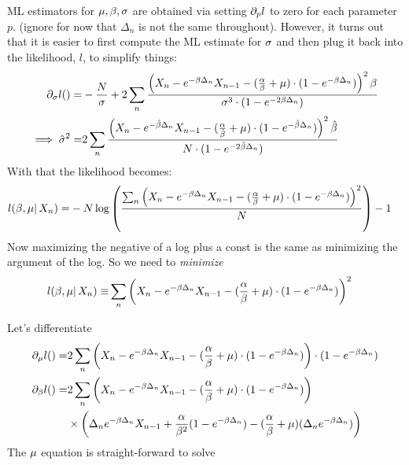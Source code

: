 \documentclass{article}
\begin{document}
ML estimators for ${\mu },{\beta},{\sigma }$ are obtained via setting ${\partial}_{p} l$ to zero for
each parameter $p$. (ignore for now that $\Delta_n$ is not the same throughout).
However, it turns out that it is easier to first compute the ML estimate for
${\sigma }$ and then plug it back into the likelihood, $l$, to simplify things:
\begin{align}
{\partial}_{{\sigma }} l()=& -\frac N{{\sigma }} + 2\sum_n
\frac{ \left( X_n - e^{-{\beta} \Delta_n} X_{n-1} -
				 (\frac {{\alpha}}{{\beta}} + {\mu }) \cdot ( 1-e^{-{\beta} \Delta_n}) \right)^2 {\beta}}
				 {{\sigma }^3 \cdot (1-e^{-2{\beta}\Delta_n})}
				 \notag
				 \\ 
\implies \hat{{\sigma }}^2 =& 2\sum_n \frac{ \left( X_n - e^{-\hat{{\beta}} \Delta_n} X_{n-1} -
				 (\frac {{\alpha}}{\hat{{\beta}}} + {\mu }) \cdot ( 1-e^{-\hat{{\beta}} \Delta_n}) \right)^2
				 \hat{{\beta}}} {N \cdot (1-e^{-2\hat{{\beta}}\Delta_n})}
				 \label{eq:sigma_root}
\end{align}
With that the likelihood becomes:
\begin{align*}
l({\beta}, {\mu } |\, X_n )=& 
 -N\log \left( 
 \frac{ \sum_n\left( X_n - e^{-{\beta} \Delta_n} X_{n-1} -
  (\frac {{{\alpha}}}{{{\beta}}} + {\mu }) \cdot ( 1-e^{-{\beta} \Delta_n})
  \right)^2}{N} \right) - 1
\end{align*}
Now maximizing the negative of a log plus a const is the same as minimizing the
argument of the log. So we need to {\itshape minimize}
\begin{align*}
l({\beta}, {\mu } |\, X_n )\equiv& 
\sum_n \left( X_n - e^{-{\beta} \Delta_n} X_{n-1} -
  (\frac {{{\alpha}}}{{{\beta}}} + {\mu }) \cdot ( 1-e^{-{\beta} \Delta_n})
  \right)^2 
\end{align*}
 
Let's differentiate
\begin{subequations}
\begin{align}
{\partial}_{{\mu }} l()=& 2 \sum_n \left( X_n - e^{-{\beta} \Delta_n} X_{n-1} -
  (\frac {{{\alpha}}}{{{\beta}}} + {\mu }) \cdot ( 1-e^{-{\beta} \Delta_n})  \right) 
  \cdot   ( 1-e^{-{\beta} \Delta_n})
\\
{\partial}_{{\beta}} l()=& 2 \sum_n \left( X_n - e^{-{\beta} \Delta_n} X_{n-1} -
  (\frac {{{\alpha}}}{{{\beta}}} + {\mu }) \cdot ( 1-e^{-{\beta} \Delta_n})  \right) 
  \\ \notag 
  & \times \left( \Delta_n e^{- {\beta} \Delta_n}X_{n-1} 
  							  + \frac{ {\alpha} } {{\beta}^2} (1-e^{-{\beta} \Delta_n}) 
  					 		  - (\frac {{{\alpha}}}{{{\beta}}} + {\mu }) ( \Delta_n e^{- {\beta} \Delta_n})          
  					 		  \right)
\end{align}
\end{subequations}
The ${\mu }$ equation is straight-forward to solve
\end{document}
